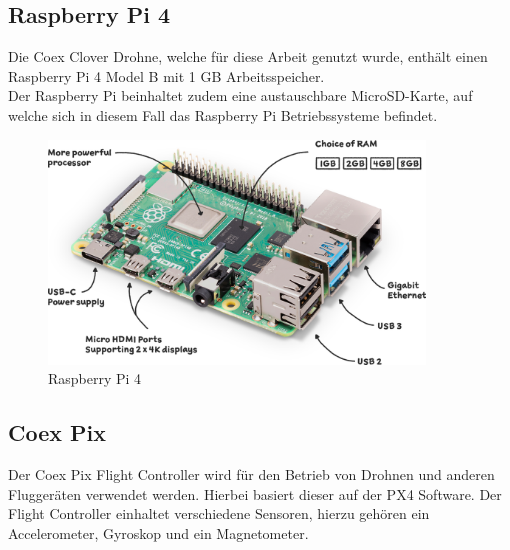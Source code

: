 \subsection{Raspberry Pi 4} \label{raspberry_pi:subsection}

Die Coex Clover Drohne, welche für diese Arbeit genutzt wurde, enthält einen Raspberry Pi 4 Model B mit 1 GB Arbeitsspeicher.\\
Der Raspberry Pi beinhaltet zudem eine austauschbare MicroSD-Karte, auf welche sich in diesem Fall das Raspberry Pi Betriebssysteme befindet. \\

\begin{figure}[htbp]
    \centering
    \includegraphics[width=10cm,keepaspectratio,angle=0]{images/raspberry-pi-4-labelled.png}
    \caption[Raspberry Pi 4]{\label{img raspberry_pi} Raspberry Pi 4 \cite{img_raspberry_pi}}
\end{figure}

\FloatBarrier

\subsection{Coex Pix} \label{coex_pix:subsection}
Der Coex Pix Flight Controller wird für den Betrieb von Drohnen und anderen Fluggeräten verwendet werden. Hierbei basiert dieser auf der PX4 Software. Der Flight Controller einhaltet verschiedene Sensoren, hierzu gehören ein Accelerometer, Gyroskop und ein Magnetometer.



